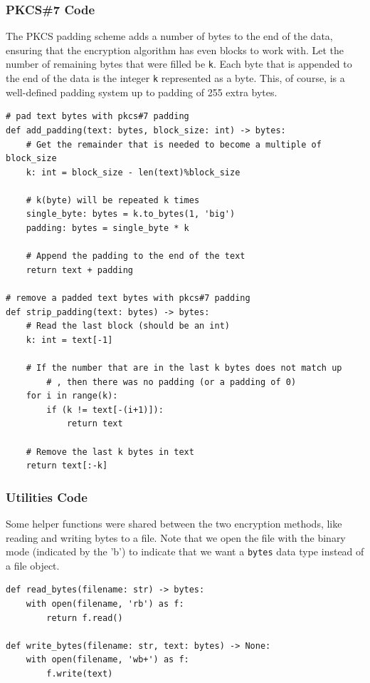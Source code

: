 \documentclass[11pt]{article}
\begin{document}
\subsubsection*{PKCS\#7 Code} 

The PKCS padding scheme adds a number of bytes to the end of the data, ensuring that the encryption algorithm has even blocks to work with. Let the number of remaining bytes that were filled be \verb|k|. Each byte that is appended to the end of the data is the integer \verb|k| represented as a byte. This, of course, is a well-defined padding system up to padding of 255 extra bytes.

\begin{lstlisting}
# pad text bytes with pkcs#7 padding
def add_padding(text: bytes, block_size: int) -> bytes:
    # Get the remainder that is needed to become a multiple of block_size
    k: int = block_size - len(text)%block_size

    # k(byte) will be repeated k times
    single_byte: bytes = k.to_bytes(1, 'big')
    padding: bytes = single_byte * k

    # Append the padding to the end of the text 
    return text + padding 

# remove a padded text bytes with pkcs#7 padding
def strip_padding(text: bytes) -> bytes:
    # Read the last block (should be an int)
    k: int = text[-1]

    # If the number that are in the last k bytes does not match up
		# , then there was no padding (or a padding of 0)
    for i in range(k):
        if (k != text[-(i+1)]):
            return text 

    # Remove the last k bytes in text 
    return text[:-k]
\end{lstlisting}

\subsubsection*{Utilities Code}

Some helper functions were shared between the two encryption methods, like reading and writing bytes to a file. Note that we open the file with the binary mode (indicated by the 'b') to indicate that we want a \verb|bytes| data type instead of a file object.

\begin{lstlisting}
def read_bytes(filename: str) -> bytes:
    with open(filename, 'rb') as f:
        return f.read()

def write_bytes(filename: str, text: bytes) -> None:
    with open(filename, 'wb+') as f:
        f.write(text)
\end{lstlisting}
\end{document}
